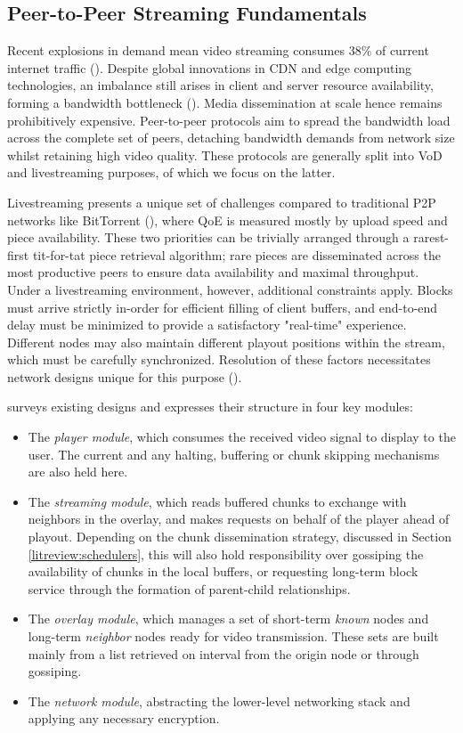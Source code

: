 \documentclass[12pt,a4paper]{article}
\begin{document}
\subsection{Peer-to-Peer Streaming Fundamentals} \label{litreview:fundamentals}
Recent explosions in demand mean video streaming consumes 38\% of current internet traffic (\cite{Sandvine2024}). Despite global innovations in CDN and edge computing technologies, an imbalance still arises in client and server resource availability, forming a bandwidth bottleneck (\cite{Ramzan2012}). Media dissemination at scale hence remains prohibitively expensive. Peer-to-peer protocols aim to spread the bandwidth load across the complete set of peers, detaching bandwidth demands from network size whilst retaining high video quality. These protocols are generally split into VoD and livestreaming purposes, of which we focus on the latter.

Livestreaming presents a unique set of challenges compared to traditional P2P networks like BitTorrent (\cite{Cohen2017}), where QoE is measured mostly by upload speed and piece availability. These two priorities can be trivially arranged through a rarest-first tit-for-tat piece retrieval algorithm; rare pieces are disseminated across the most productive peers to ensure data availability and maximal throughput. Under a livestreaming environment, however, additional constraints apply. Blocks must arrive strictly in-order for efficient filling of client buffers, and end-to-end delay must be minimized to provide a satisfactory "real-time" experience. Different nodes may also maintain different playout positions within the stream, which must be carefully synchronized. Resolution of these factors necessitates network designs unique for this purpose (\cite{Liu2008}).

\cite{Friedman2015} surveys existing designs and expresses their structure in four key modules:

\begin{itemize}
	\item The \textit{player module}, which consumes the received video signal to display to the user. The current  and any halting, buffering or chunk skipping mechanisms are also held here.
	\item The \textit{streaming module}, which reads buffered chunks to exchange with neighbors in the overlay, and makes requests on behalf of the player ahead of playout. Depending on the chunk dissemination strategy, discussed in Section \ref{litreview:schedulers}, this will also hold responsibility over gossiping the availability of chunks in the local buffers, or requesting long-term block service through the formation of parent-child relationships.
	\item The \textit{overlay module}, which manages a set of short-term \textit{known} nodes and long-term \textit{neighbor} nodes ready for video transmission. These sets are built mainly from a list retrieved on interval from the origin node or through gossiping.
	\item The \textit{network module}, abstracting the lower-level networking stack and applying any necessary encryption.
\end{itemize}
\end{document}
